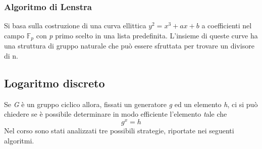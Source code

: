 \documentclass{article}
\begin{document}
	\subsubsection{Algoritmo di Lenstra}
	Si basa sulla costruzione di una curva ellittica \(y^2=x^3+ax+b\) a coefficienti nel campo \(\mathbb{F}_p\) con \textit{p} primo scelto in una lista predefinita. L'insieme di queste curve ha una struttura di gruppo naturale che può essere sfruttata per trovare un divisore di n.
	\vspace{1cm}
	
	\vspace{1cm}\vspace{1cm}
	
	\subsection{Logaritmo discreto}
	Se \textit{G} è un gruppo ciclico allora, fissati un generatore \textit{g} ed un elemento \textit{h}, ci si può chiedere se è possibile determinare in modo efficiente l'elemento \textit tale che \[g^x=h\]
	Nel corso sono stati analizzati tre possibili strategie, riportate nei seguenti algoritmi. 
	\vspace{1cm}
	
	\vspace{1cm}\vspace{1cm}
	
	\vspace{1cm}
	
	\vspace{1cm}\vspace{1cm}
	
	\vspace{1cm}
	
	\vspace{1cm}\vspace{1cm}
	
\end{document}
